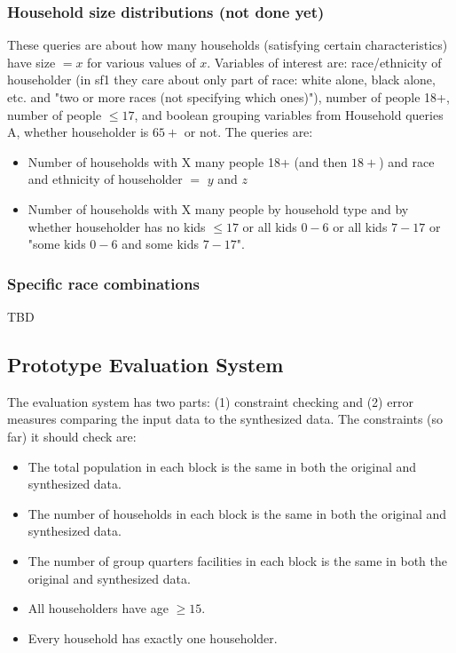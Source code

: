 \documentclass{amsart}
\begin{document}
{\subsubsection{Household size distributions (not done yet)}
These queries are about how many households (satisfying certain characteristics) have size $=x$ for various values of $x$. Variables of interest are: race/ethnicity of householder (in sf1 they care about only part of race: white alone, black alone, etc. and "two or more races (not specifying which ones)"), number of people 18+, number of people $\leq 17$, and boolean grouping variables from Household queries A, whether householder is $65+$ or not.
The queries are:
\begin{itemize}
\item Number of households with X many people 18+ (and then $18+$) and race and ethnicity of householder $=$ $y$ and $z$
\item Number of households with X many people by household type and by whether householder has no kids $\leq 17$ or all kids $0-6$ or all kids $7-17$ or "some kids $0-6$ and some kids $7-17$".
\end{itemize}
\subsubsection{Specific race combinations}
TBD


\subsection{Prototype Evaluation System}\label{sec:milestone:prototype}
The evaluation system has two parts: (1) constraint checking and (2) error measures comparing the input data to the synthesized data.
The constraints (so far) it should check are:
\begin{itemize}
\item The total population in each block is the same in both the original and synthesized data.
\item The number of households in each block is the same in both the original and synthesized data.
\item The number of group quarters facilities in each block is the same in both the original and synthesized data.
\item All householders have age $\geq 15$.
\item Every household has exactly one householder.
\end{itemize}

}
\end{document}
